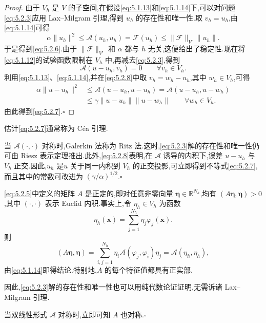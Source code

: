 \begin{proof}
由于 \(V_h\) 是 \(V\) 的子空间,在假设\eqref{eq:5.1.13}和\eqref{eq:5.1.14}下,可以对问题\eqref{eq:5.2.3}应用 Lax--Milgram 引理,得到 \(u_h\) 的存在性和唯一性.取 \(v_h=u_h\),由\eqref{eq:5.1.14}可得
\[
  \alpha\|u_h\|^2\le\mathcal A(u_h,u_h)=\mathcal F(u_h)
    \le\|\mathcal F\|_{V'}\|u_h\|.
\]
于是得到\eqref{eq:5.2.6}.由于 \(\|\mathcal F\|_{V'}\) 和 \(\alpha\) 都与 \(h\) 无关,这便给出了稳定性.现在将\eqref{eq:5.1.12}的试验函数限制在 \(V_h\) 中,再减去\eqref{eq:5.2.3},得到
\begin{equation}\label{eq:5.2.8}
  \mathcal A(u-u_h,v_h)=0\qquad\forall v_h\in V_h.
\end{equation}
利用\eqref{eq:5.1.13}、\eqref{eq:5.1.14},并在\eqref{eq:5.2.8}中取 \(v_h=w_h-u_h\),其中 \(w_h\in V_h\),可得
\[
  \begin{aligned}
    \alpha\|u-u_h\|^2
    &\le\mathcal A(u-u_h,u-u_h)=\mathcal A(u-u_h,u-w_h)\\
    &\le\gamma\|u-u_h\|\|u-w_h\|\qquad\forall w_h\in V_h.
  \end{aligned}
\]
由此得到\eqref{eq:5.2.7}.\hfill\(\square\)
\end{proof}

估计\eqref{eq:5.2.7}通常称为 Céa 引理.

\begin{note}
当 \(\mathcal A(\cdot,\cdot)\) 对称时,Galerkin 法称为 Ritz 法.这时,\eqref{eq:5.2.3}解的存在性和唯一性仍可由 Riesz 表示定理推出.此外,\eqref{eq:5.2.8}表明,在 \(\mathcal A\) 诱导的内积下,误差 \(u-u_h\) 与 \(V_h\) 正交.因此,\(u_h\) 是\(u\) 关于同一内积到 \(V_h\) 的正交投影,可立即得到不等式\eqref{eq:5.2.7},而且其中的常数可改进为 \((\gamma/\alpha)^{1/2}\).\hfill\(\square\)
\end{note}

\begin{note}
\eqref{eq:5.2.5}中定义的矩阵 \(A\) 是正定的,即对任意非零向量 \(\boldsymbol{\eta}\in\mathbb R^{N_h}\),均有 \((A\boldsymbol{\eta},\boldsymbol{\eta})>0\),其中 \((\cdot,\cdot)\) 表示 Euclid 内积.事实上,令 \(\eta_h\in V_h\) 为函数
\begin{equation}\label{eq:5.2.9}
  \eta_h(\boldsymbol{x})=\sum_{j=1}^{N_h}\eta_j\varphi_j(\boldsymbol{x}).
\end{equation}
则
\[
  (A\boldsymbol{\eta},\boldsymbol{\eta})
   =\sum_{i,j=1}^{N_h}\eta_i\mathcal A(\varphi_j,\varphi_i)\eta_j
   =\mathcal A(\eta_h,\eta_h),
\]
由\eqref{eq:5.1.14}即得结论.特别地,\(A\) 的每个特征值都具有正实部.

因此,\eqref{eq:5.2.3}解的存在性和唯一性也可以用纯代数论证证明,无需诉诸 Lax--Milgram 引理.

当双线性形式 \(\mathcal A\) 对称时,立即可知 \(A\) 也对称.\hfill\(\square\)
\end{note}


